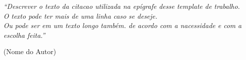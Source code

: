 \thispagestyle{empty}
\begin{spacing}{1}
\vspace*{\fill}

\epigraph{\normalsize\itshape``Descrever o texto da citacao utilizada na epígrafe desse template de trabalho.\\
O texto pode ter mais de uma linha caso se deseje.\\
Ou pode ser em um texto longo também. de acordo com a nacessidade e com a escolha feita.''}{(Nome do Autor)}

\end{spacing}
\newpage




